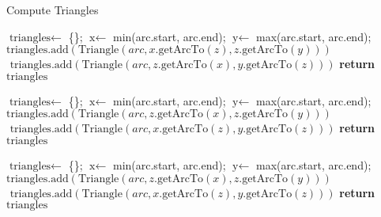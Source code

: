 \begin{algorithm}
    \caption{Compute Triangles}
    \begin{algorithmic}[1]
    
    \State $\text{triangles} \gets$ \{\}; 
    $\text{x} \gets$ min(arc.start, arc.end);
    $\text{y} \gets$ max(arc.start, arc.end);
                 $\text{triangles.add}(\text{Triangle}(arc, x.\text{getArcTo}(z), z.\text{getArcTo}(y)))$
            \Else  $\text{ triangles.add}(\text{Triangle}(arc, z.\text{getArcTo}(x), y.\text{getArcTo}(z)))$
            \EndIf
        \EndIf
    \EndFor
    \State \textbf{return} $\text{triangles}$
    \EndProcedure
    
    \State $\text{triangles} \gets$ \{\};
    $\text{x} \gets$ min(arc.start, arc.end);
    $\text{y} \gets$ max(arc.start, arc.end);
                 $\text{triangles.add}(\text{Triangle}(arc, z.\text{getArcTo}(x), z.\text{getArcTo}(y)))$
            \Else  $\text{ triangles.add}(\text{Triangle}(arc, x.\text{getArcTo}(z), y.\text{getArcTo}(z)))$
            \EndIf
        \EndIf
    \EndFor
    \State \textbf{return} $\text{triangles}$
    \EndProcedure
    
    \State $\text{triangles} \gets$ \{\};
    $\text{x} \gets$ min(arc.start, arc.end);
    $\text{y} \gets$ max(arc.start, arc.end);
                 $\text{triangles.add}(\text{Triangle}(arc, z.\text{getArcTo}(x), z.\text{getArcTo}(y)))$
            \Else  $\text{ triangles.add}(\text{Triangle}(arc, x.\text{getArcTo}(z), y.\text{getArcTo}(z)))$
            \EndIf
        \EndIf
    \EndFor
    \State \textbf{return} $\text{triangles}$
    \EndProcedure
    
    \end{algorithmic}
    \end{algorithm}
    